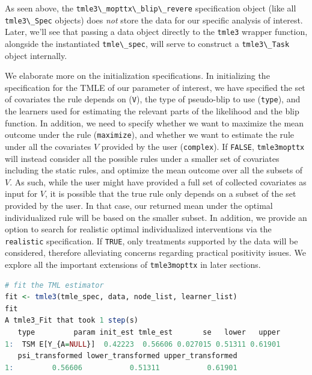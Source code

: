 \documentclass[12pt, krantz2,]{krantz}
\newcommand{\passthrough}[1]{#1}
\theoremstyle{definition}
\theoremstyle{definition}
\theoremstyle{definition}
\newcommand{\1}{\mathbbm{1}}
\begin{document}
As seen above, the \passthrough{\lstinline!tmle3\_mopttx\_blip\_revere!} specification object
(like all \passthrough{\lstinline!tmle3\_Spec!} objects) does \emph{not} store the data for our
specific analysis of interest. Later,
we'll see that passing a data object directly to the \passthrough{\lstinline!tmle3!} wrapper function,
alongside the instantiated \passthrough{\lstinline!tmle\_spec!}, will serve to construct a \passthrough{\lstinline!tmle3\_Task!}
object internally.

We elaborate more on the initialization specifications. In initializing the
specification for the TMLE of our parameter of interest, we have specified the
set of covariates the rule depends on (\passthrough{\lstinline!V!}), the type of pseudo-blip to use
(\passthrough{\lstinline!type!}), and the learners used for estimating the relevant parts of the
likelihood and the blip function. In addition, we need to specify whether we
want to maximize the mean outcome under the rule (\passthrough{\lstinline!maximize!}), and whether we
want to estimate the rule under all the covariates \(V\) provided by the user
(\passthrough{\lstinline!complex!}). If \passthrough{\lstinline!FALSE!}, \passthrough{\lstinline!tmle3mopttx!} will instead consider all the possible
rules under a smaller set of covariates including the static rules, and optimize
the mean outcome over all the subsets of \(V\). As such, while the user might have
provided a full set of collected covariates as input for \(V\), it is possible
that the true rule only depends on a subset of the set provided by the user. In
that case, our returned mean under the optimal individualized rule will be based
on the smaller subset. In addition, we provide an option to search for realistic
optimal individualized interventions via the \passthrough{\lstinline!realistic!} specification. If
\passthrough{\lstinline!TRUE!}, only treatments supported by the data will be considered, therefore
alleviating concerns regarding practical positivity issues. We explore all the
important extensions of \passthrough{\lstinline!tmle3mopttx!} in later sections.

\begin{lstlisting}[language=R]
# fit the TML estimator
fit <- tmle3(tmle_spec, data, node_list, learner_list)
fit
A tmle3_Fit that took 1 step(s)
   type         param init_est tmle_est       se   lower   upper
1:  TSM E[Y_{A=NULL}]  0.42223  0.56606 0.027015 0.51311 0.61901
   psi_transformed lower_transformed upper_transformed
1:         0.56606           0.51311           0.61901
\end{lstlisting}
\end{document}
